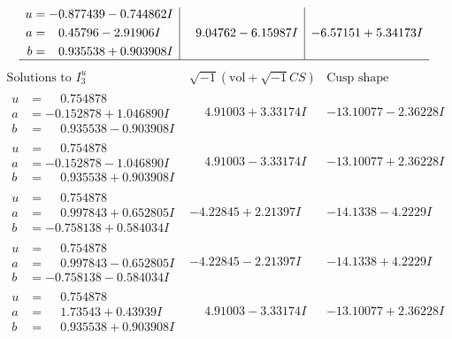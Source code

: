 \documentclass[1p]{elsarticle_modified}
\theoremstyle{definition}
\newcommand{\I}{\sqrt{-1}}
\begin{document}
$$\begin{array}{c|c|c}
\begin{aligned}
u &= -0.877439 - 0.744862 I \\
a &= \phantom{-}0.45796 - 2.91906 I \\
b &= \phantom{-}0.935538 + 0.903908 I\end{aligned}
 & \phantom{-}9.04762 - 6.15987 I & -6.57151 + 5.34173 I\\
 \hline 
 \end{array}$$\newpage$$\begin{array}{c|c|c}  
\text{Solutions to }I^u_{3}& \I (\text{vol} + \sqrt{-1}CS) & \text{Cusp shape}\\
 \hline 
\begin{aligned}
u &= \phantom{-}0.754878\phantom{ +0.000000I} \\
a &= -0.152878 + 1.046890 I \\
b &= \phantom{-}0.935538 - 0.903908 I\end{aligned}
 & \phantom{-}4.91003 + 3.33174 I & -13.10077 - 2.36228 I \\ \hline\begin{aligned}
u &= \phantom{-}0.754878\phantom{ +0.000000I} \\
a &= -0.152878 - 1.046890 I \\
b &= \phantom{-}0.935538 + 0.903908 I\end{aligned}
 & \phantom{-}4.91003 - 3.33174 I & -13.10077 + 2.36228 I \\ \hline\begin{aligned}
u &= \phantom{-}0.754878\phantom{ +0.000000I} \\
a &= \phantom{-}0.997843 + 0.652805 I \\
b &= -0.758138 + 0.584034 I\end{aligned}
 & -4.22845 + 2.21397 I & -14.1338 - 4.2229 I \\ \hline\begin{aligned}
u &= \phantom{-}0.754878\phantom{ +0.000000I} \\
a &= \phantom{-}0.997843 - 0.652805 I \\
b &= -0.758138 - 0.584034 I\end{aligned}
 & -4.22845 - 2.21397 I & -14.1338 + 4.2229 I \\ \hline\begin{aligned}
u &= \phantom{-}0.754878\phantom{ +0.000000I} \\
a &= \phantom{-}1.73543 + 0.43939 I \\
b &= \phantom{-}0.935538 + 0.903908 I\end{aligned}
 & \phantom{-}4.91003 - 3.33174 I & -13.10077 + 2.36228 I \\ \hline\begin{aligned}

\end{aligned}
\end{array}$$
\end{document}
